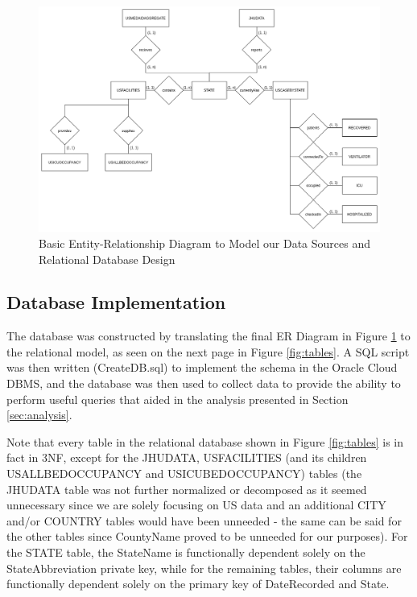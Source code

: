 \documentclass[11pt]{article}
\begin{document}
\FloatBarrier
\begin{figure}[h]
    \centering
    \includegraphics[width=\textwidth]{diagrams/ER1.png}
    \caption{Basic Entity-Relationship Diagram to Model our Data Sources and Relational Database Design}
    \label{fig:er1}
\end{figure}
\FloatBarrier

\pagebreak

\subsection{Database Implementation}
\label{subsec:implementation}

\noindent
The database was constructed by translating the final ER Diagram in Figure \ref{fig:er1} to the relational model, as seen on the next page in Figure \ref{fig:tables}. A SQL script was then written (CreateDB.sql) to implement the schema in the Oracle Cloud DBMS, and the database was then used to collect data to provide the ability to perform useful queries that aided in the analysis presented in Section \ref{sec:analysis}.

\noindent
Note that every table in the relational database shown in Figure \ref{fig:tables} is in fact in 3NF, except for the JHUDATA, USFACILITIES (and its children USALLBEDOCCUPANCY and USICUBEDOCCUPANCY) tables (the JHUDATA table was not further normalized or decomposed as it seemed unnecessary since we are solely focusing on US data and an additional CITY and/or COUNTRY tables would have been unneeded - the same can be said for the other tables since CountyName proved to be unneeded for our purposes). For the STATE table, the StateName is functionally dependent solely on the StateAbbreviation private key, while for the remaining tables, their columns are functionally dependent solely on the primary key of DateRecorded and State.
\end{document}
